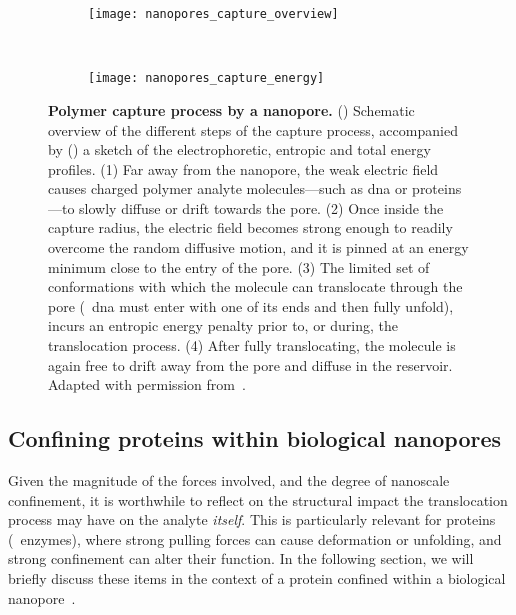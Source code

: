 %
\begin{figure*}[p]
  \centering

  \begin{subfigure}[t]{115mm}
    \centering
    \caption{}\vspace{-2.5mm}\label{fig:nanopores_capture_overview}
    \texttt{[image: nanopores\_capture\_overview]}
  \end{subfigure}
  \\
  \begin{subfigure}[t]{115mm}
    \centering
    \caption{}\vspace{-2.5mm}\label{fig:nanopores_capture_energy}
    \texttt{[image: nanopores\_capture\_energy]}
  \end{subfigure}

\caption[Polymer capture process by a nanopore]{%
  \textbf{Polymer capture process by a nanopore.}
  ()
  Schematic overview of the different steps of the capture process, accompanied by
  ()
  a sketch of the electrophoretic, entropic and total energy profiles.
  (1) Far away from the nanopore, the weak electric field causes charged polymer analyte molecules---such as
  \gls{dna} or proteins---to slowly diffuse or drift towards the pore. (2) Once inside the capture radius, the
  electric field becomes strong enough to readily overcome the random diffusive motion, and it is pinned at an
  energy minimum close to the entry of the pore. (3) The limited set of conformations with which the molecule
  can translocate through the pore (\eg~\gls{dna} must enter with one of its ends and then fully unfold),
  incurs an entropic energy penalty prior to, or during, the translocation process. (4) After fully
  translocating, the molecule is again free to drift away from the pore and diffuse in the reservoir.
  Adapted with permission from~\cite{Nomidis-2018}.
  }\label{fig:nanopores_capture}
\end{figure*}
%



\subsection{Confining proteins within biological nanopores}
%
\label{sec:np:confinement}
%

Given the magnitude of the forces involved, and the degree of nanoscale confinement, it is worthwhile to
reflect on the structural impact the translocation process may have on the analyte \emph{itself}. This is
particularly relevant for proteins (\eg~enzymes), where strong pulling forces can cause deformation or
unfolding, and strong confinement can alter their function. In the following section, we will briefly discuss
these items in the context of a protein confined within a biological nanopore~\cite{Galenkamp-2020}.


